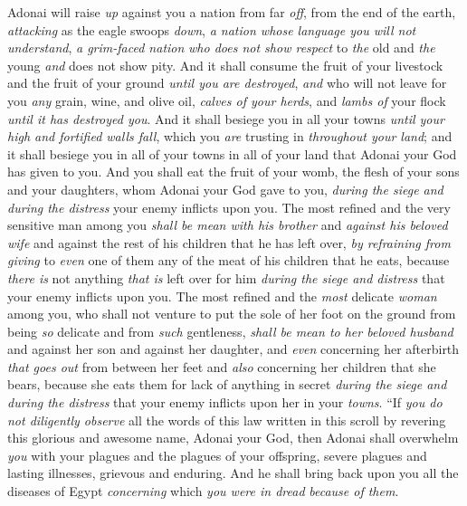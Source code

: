 \begin{biblechapter}
\verse Adonai will raise \textit{up} against you a nation from far \textit{off}, from the end of the earth, \textit{attacking} as the eagle swoops \textit{down}, \textit{a nation whose language you will not understand},
\verse \textit{a grim-faced nation} \textit{who does not show respect} to \textit{the} old and \textit{the} young \textit{and} does not show pity.
\verse And it shall consume the fruit of your livestock and the fruit of your ground \textit{until you are destroyed}, \textit{and} who will not leave for you \textit{any} grain, wine, and olive oil, \textit{calves of your herds}, and \textit{lambs of} your flock \textit{until it has destroyed you}.
\verse And it shall besiege you in all your towns \textit{until your high and fortified walls fall}, which you \textit{are} trusting in \textit{throughout your land}; and it shall besiege you in all of your towns in all of your land that Adonai your God has given to you.
\verse And you shall eat the fruit of your womb, the flesh of your sons and your daughters, whom Adonai your God gave to you, \textit{during the siege and during the distress} your enemy inflicts upon you.
\verse The most refined and the very sensitive man among you \textit{shall be mean with his brother} and \textit{against his beloved wife} and against the rest of his children that he has left over,
\verse \textit{by refraining from giving} to \textit{even} one of them any of the meat of his children that he eats, because \textit{there is} not anything \textit{that is} left over for him \textit{during the siege and distress} that your enemy inflicts upon you.
\verse The most refined and the \textit{most} delicate \textit{woman} among you, who shall not venture to put the sole of her foot on the ground from being \textit{so} delicate and from \textit{such} gentleness, \textit{shall be mean to her beloved husband} and against her son and against her daughter,
\verse and \textit{even} concerning her afterbirth \textit{that goes out} from between her feet and \textit{also} concerning her children that she bears, because she eats them for lack of anything in secret \textit{during the siege and during the distress} that your enemy inflicts upon her in your \textit{towns}.
\verse “If \textit{you do not diligently observe} all the words of this law written in this scroll by revering this glorious and awesome name, Adonai your God,
\verse then Adonai shall overwhelm \textit{you} with your plagues and the plagues of your offspring, severe plagues and lasting illnesses, grievous and enduring.
\verse And he shall bring back upon you all the diseases of Egypt \textit{concerning} which \textit{you were in dread} \textit{because of them}.

\end{biblechapter}
